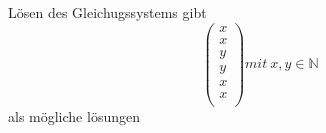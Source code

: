Lösen des Gleichugssystems gibt\\
\[ \begin{pmatrix}
x\\
x\\
y\\
y\\
x\\
x\\
\end{pmatrix} mit \ x,y \in \mathbb{N}
\]
als mögliche lösungen


